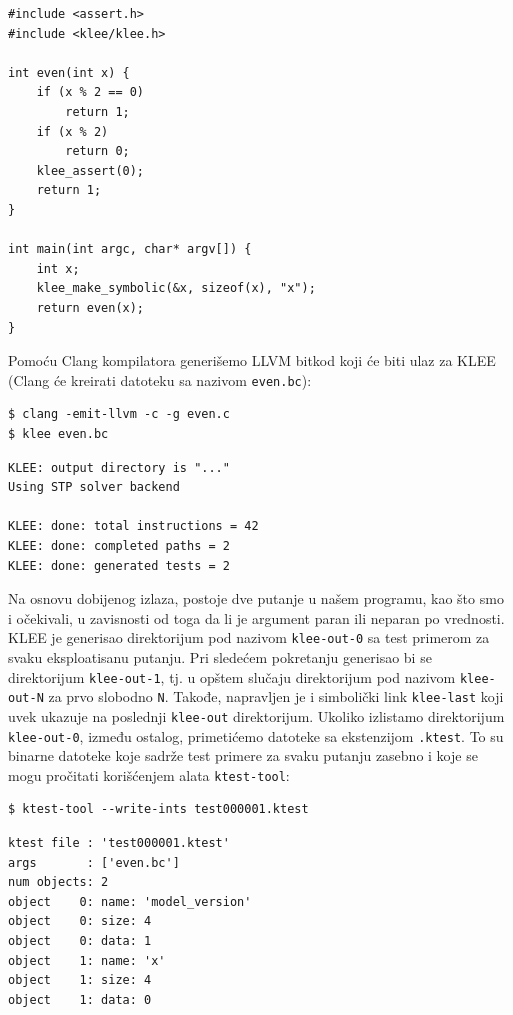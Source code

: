 \begin{verbatim}
#include <assert.h>
#include <klee/klee.h>

int even(int x) {
    if (x % 2 == 0)
        return 1;
    if (x % 2)
        return 0;
    klee_assert(0);
    return 1;
}

int main(int argc, char* argv[]) {
    int x;
    klee_make_symbolic(&x, sizeof(x), "x");
    return even(x);
}
\end{verbatim}

Pomoću Clang kompilatora generišemo LLVM bitkod koji će biti ulaz za KLEE (Clang će kreirati datoteku sa nazivom \texttt{even.bc}):

\begin{verbatim}
$ clang -emit-llvm -c -g even.c
$ klee even.bc
\end{verbatim}

\begin{verbatim}
KLEE: output directory is "..."
Using STP solver backend

KLEE: done: total instructions = 42
KLEE: done: completed paths = 2
KLEE: done: generated tests = 2
\end{verbatim}

Na osnovu dobijenog izlaza, postoje dve putanje u našem programu, kao što smo i očekivali, u zavisnosti od toga da li je argument paran ili neparan po vrednosti. KLEE je generisao direktorijum pod nazivom \texttt{klee-out-0} sa test primerom za svaku eksploatisanu putanju. Pri sledećem pokretanju generisao bi se direktorijum \texttt{klee-out-1}, tj. u opštem slučaju direktorijum pod nazivom \texttt{klee-out-N} za prvo slobodno \texttt{N}. Takođe, napravljen je i simbolički link \texttt{klee-last} koji uvek ukazuje na poslednji \texttt{klee-out} direktorijum. Ukoliko izlistamo direktorijum \texttt{klee-out-0}, između ostalog, primetićemo datoteke sa ekstenzijom \texttt{.ktest}. To su binarne datoteke koje sadrže test primere za svaku putanju zasebno i koje se mogu pročitati korišćenjem alata \texttt{ktest-tool}:

\begin{verbatim}
$ ktest-tool --write-ints test000001.ktest
\end{verbatim}

\begin{verbatim}
ktest file : 'test000001.ktest'
args       : ['even.bc']
num objects: 2
object    0: name: 'model_version'
object    0: size: 4
object    0: data: 1
object    1: name: 'x'
object    1: size: 4
object    1: data: 0
\end{verbatim}

